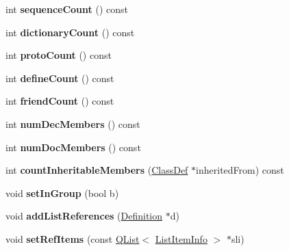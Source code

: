 \begin{DoxyCompactItemize}
int {\bfseries sequence\+Count} () const
\item 
\mbox{\label{class_member_group_a595ba054744761f0bb4c5581315e16c4}} 
int {\bfseries dictionary\+Count} () const
\item 
\mbox{\label{class_member_group_af43f4077712885e07defff9471fd68fe}} 
int {\bfseries proto\+Count} () const
\item 
\mbox{\label{class_member_group_af6322adafdf43a9e1053ec295c4587af}} 
int {\bfseries define\+Count} () const
\item 
\mbox{\label{class_member_group_aaab47e6a0923db2b66ee02a986cf1164}} 
int {\bfseries friend\+Count} () const
\item 
\mbox{\label{class_member_group_a1df8307d8e3bad5587972fe4feff8541}} 
int {\bfseries num\+Dec\+Members} () const
\item 
\mbox{\label{class_member_group_a58cc7a88c6cd63de9c9e67fbfb619a29}} 
int {\bfseries num\+Doc\+Members} () const
\item 
\mbox{\label{class_member_group_abe62bb938ec882e5485b41b4d84c903b}} 
int {\bfseries count\+Inheritable\+Members} (\mbox{\hyperlink{class_class_def}{Class\+Def}} $\ast$inherited\+From) const
\item 
\mbox{\label{class_member_group_a544526a0c59d95f8ce1af3b44d252861}} 
void {\bfseries set\+In\+Group} (bool b)
\item 
\mbox{\label{class_member_group_a847857b04f0977eef02f896db366f18b}} 
void {\bfseries add\+List\+References} (\mbox{\hyperlink{class_definition}{Definition}} $\ast$d)
\item 
\mbox{\label{class_member_group_af56ab646e46a0cd646c06dd9b76cffd2}} 
void {\bfseries set\+Ref\+Items} (const \mbox{\hyperlink{class_q_list}{Q\+List}}$<$ \mbox{\hyperlink{struct_list_item_info}{List\+Item\+Info}} $>$ $\ast$sli)
\item 
\mbox{\label{class_member_group_a463d1316ace77653754cd79e8a57d2d6}} 

\end{DoxyCompactItemize}
